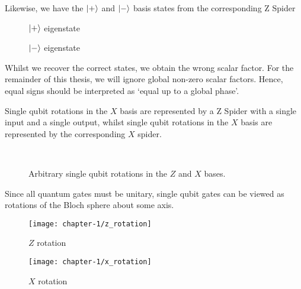 Likewise, we have the $\ket +$ and $\ket -$ basis states from the corresponding Z Spider
\begin{figure}[H]
\centering
\begin{minipage}{.4\textwidth}
    \centering
    \caption{$\ket +$ eigenstate}
\end{minipage}%
\begin{minipage}{.4\textwidth}
    \centering
    \caption{$\ket -$ eigenstate}
\end{minipage}
\end{figure}

Whilst we recover the correct states, we obtain the wrong scalar factor. For the remainder of this thesis, we will ignore global non-zero scalar factors. Hence, equal signs should be interpreted as `equal up to a global phase'.

Single qubit rotations in the $X$ basis are represented by a Z Spider with a single input and a single output, whilst single qubit rotations in the $X$ basis are represented by the corresponding $X$ spider.
\begin{figure}[H]
\centering
{} \\[1ex]
\caption{Arbitrary single qubit rotations in the $Z$ and $X$ bases.}
\end{figure}

Since all quantum gates must be unitary, single qubit gates can be viewed as rotations of the Bloch sphere about some axis.
\begin{figure}[H]
\centering
\begin{minipage}{.4\textwidth}
    \centering
    \texttt{[image: chapter-1/z\_rotation]}
    \caption{$Z$ rotation}
\end{minipage}%
\begin{minipage}{.4\textwidth}
    \centering
    \texttt{[image: chapter-1/x\_rotation]}
    \caption{$X$ rotation}
\end{minipage}
\end{figure}



